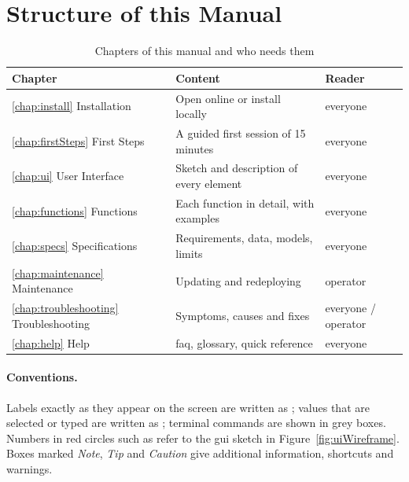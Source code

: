 \section{Structure of this Manual}
\label{sec:manualStructure}

\begin{table}[H]
\centering
\caption{Chapters of this manual and who needs them}
\label{tab:manualStructure}
\small
\begin{tabularx}{\linewidth}{@{}lXl@{}}
\toprule
\textbf{Chapter} & \textbf{Content} & \textbf{Reader} \\
\midrule
\ref{chap:install}  Installation     & Open online or install locally          & everyone \\
\ref{chap:firstSteps} First Steps    & A guided first session of 15 minutes   & everyone \\
\ref{chap:ui}   User Interface       & Sketch and description of every element & everyone \\
\ref{chap:functions} Functions       & Each function in detail, with examples  & everyone \\
\ref{chap:specs} Specifications      & Requirements, data, models, limits      & everyone \\
\ref{chap:maintenance} Maintenance   & Updating and redeploying                & operator \\
\ref{chap:troubleshooting} Troubleshooting & Symptoms, causes and fixes        & everyone / operator \\
\ref{chap:help} Help                 & \ac{faq}, glossary, quick reference     & everyone \\
\bottomrule
\end{tabularx}
\end{table}

\paragraph{Conventions.} Labels exactly as they appear on the screen are written as ; values that are selected or typed are written as ; terminal commands are shown in grey boxes. Numbers in red circles such as  refer to the \ac{gui} sketch in Figure~\ref{fig:uiWireframe}. Boxes marked \emph{Note}, \emph{Tip} and \emph{Caution} give additional information, shortcuts and warnings.
